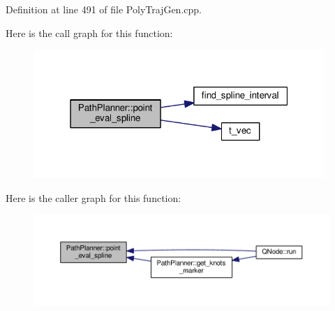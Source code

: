 Definition at line 491 of file Poly\+Traj\+Gen.\+cpp.



Here is the call graph for this function\+:
\nopagebreak
\begin{figure}[H]
\begin{center}
\leavevmode
\includegraphics[width=313pt]{class_path_planner_aa12888c52d7cb2d429c3782060b9b45e_cgraph}
\end{center}
\end{figure}




Here is the caller graph for this function\+:
\nopagebreak
\begin{figure}[H]
\begin{center}
\leavevmode
\includegraphics[width=350pt]{class_path_planner_aa12888c52d7cb2d429c3782060b9b45e_icgraph}
\end{center}
\end{figure}


